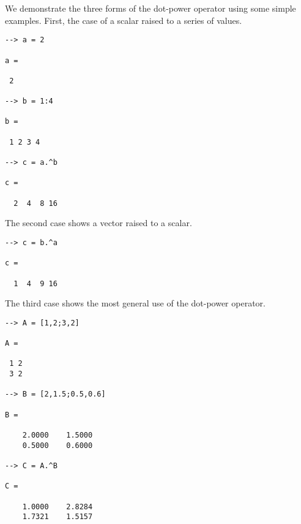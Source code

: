 We demonstrate the three forms of the dot-power operator using some simple examples.  First, the case of a scalar raised to a series of values.
\begin{verbatim}
--> a = 2

a = 

 2 

--> b = 1:4

b = 

 1 2 3 4 

--> c = a.^b

c = 

  2  4  8 16 
\end{verbatim}
The second case shows a vector raised to a scalar.
\begin{verbatim}
--> c = b.^a

c = 

  1  4  9 16 
\end{verbatim}
The third case shows the most general use of the dot-power operator.
\begin{verbatim}
--> A = [1,2;3,2]

A = 

 1 2 
 3 2 

--> B = [2,1.5;0.5,0.6]

B = 

    2.0000    1.5000 
    0.5000    0.6000 

--> C = A.^B

C = 

    1.0000    2.8284 
    1.7321    1.5157 
\end{verbatim}
